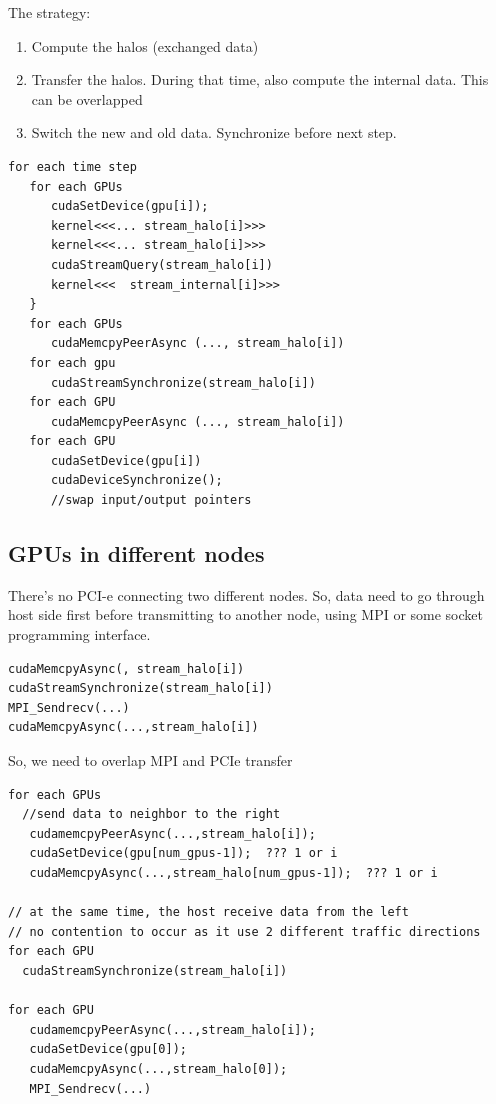 The strategy:
\begin{enumerate}
  \item Compute the halos (exchanged data)
  \item Transfer the halos. During that time, also compute the internal data.
  This can be overlapped
  \item Switch the new and old data. Synchronize before next step. 
\end{enumerate}
\begin{verbatim}
for each time step
   for each GPUs
      cudaSetDevice(gpu[i]);
      kernel<<<... stream_halo[i]>>>
      kernel<<<... stream_halo[i]>>>
      cudaStreamQuery(stream_halo[i])  
      kernel<<<  stream_internal[i]>>>
   }
   for each GPUs
      cudaMemcpyPeerAsync (..., stream_halo[i])
   for each gpu
      cudaStreamSynchronize(stream_halo[i])
   for each GPU
      cudaMemcpyPeerAsync (..., stream_halo[i])
   for each GPU
      cudaSetDevice(gpu[i])
      cudaDeviceSynchronize();
      //swap input/output pointers
\end{verbatim}


\subsection{GPUs in different nodes}

There's no PCI-e connecting two different nodes. So, data need to go through
host side first before transmitting to another node, using MPI or some socket
programming interface. 
\begin{verbatim}
cudaMemcpyAsync(, stream_halo[i])
cudaStreamSynchronize(stream_halo[i])
MPI_Sendrecv(...)
cudaMemcpyAsync(...,stream_halo[i])
\end{verbatim}
So, we need to overlap MPI and PCIe transfer
\begin{verbatim}
for each GPUs
  //send data to neighbor to the right
   cudamemcpyPeerAsync(...,stream_halo[i]);
   cudaSetDevice(gpu[num_gpus-1]);  ??? 1 or i
   cudaMemcpyAsync(...,stream_halo[num_gpus-1]);  ??? 1 or i
   
// at the same time, the host receive data from the left
// no contention to occur as it use 2 different traffic directions
for each GPU
  cudaStreamSynchronize(stream_halo[i])
  
for each GPU
   cudamemcpyPeerAsync(...,stream_halo[i]);
   cudaSetDevice(gpu[0]);
   cudaMemcpyAsync(...,stream_halo[0]);
   MPI_Sendrecv(...)
   
\end{verbatim}


